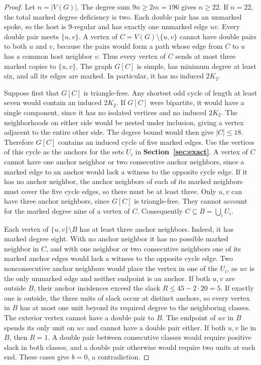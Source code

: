 \begin{proof}
Let $n=|V(G)|$. The degree sum $9n\ge2m=196$ gives $n\ge22$.
If $n=22$, the total marked degree deficiency is two. Each
double pair has an unmarked spoke, so the host is 9-regular
and has exactly one unmarked edge $uv$. Every double pair
meets $\{u,v\}$. A vertex of $C=V(G)\setminus\{u,v\}$ cannot
have double pairs to both $u$ and $v$, because the pairs
would form a path whose edge from $C$ to $u$ has a common
host neighbor $v$. Thus every vertex of $C$ sends at most
three marked copies to $\{u,v\}$. The graph $G[C]$ is
simple, has minimum degree at least six, and all its edges
are marked. In particular, it has no induced $2K_2$.

Suppose first that $G[C]$ is triangle-free. Any shortest odd
cycle of length at least seven would contain an induced
$2K_2$. If $G[C]$ were bipartite, it would have a single
component, since it has no isolated vertices and no induced
$2K_2$. The neighborhoods on either side would be nested
under inclusion, giving a vertex adjacent to the entire
other side. The degree bound would then give $|C|\le18$.
Therefore $G[C]$ contains an induced cycle of five marked
edges. Use the vertices of this cycle as the anchors for
the sets $U_i$ in \textbf{Section~\ref{sec:exact}}.
A vertex of $C$ cannot have one anchor neighbor or two
consecutive anchor neighbors, since a marked edge to an
anchor would lack a witness to the opposite cycle edge.
If it has no anchor neighbor, the anchor neighbors of
each of its marked neighbors must cover the five cycle
edges, so there must be at least three. Only $u,v$ can
have three anchor neighbors, since $G[C]$ is triangle-free.
They cannot account for the marked degree nine of a vertex
of $C$. Consequently $C\subseteq B=\bigcup_i U_i$.

Each vertex of $\{u,v\}\setminus B$ has at least three
anchor neighbors. Indeed, it has marked degree eight.
With no anchor neighbor it has no possible marked neighbor
in $C$, and with one neighbor or two consecutive neighbors
one of its marked anchor edges would lack a witness to the
opposite cycle edge. Two nonconsecutive anchor neighbors would
place the vertex in one of the $U_i$, as $uv$ is the only unmarked
edge and neither endpoint is an anchor. If both $u,v$ are outside
$B$, their anchor incidences exceed the slack $R\le45-2\cdot20=5$. If
exactly one is outside, the three units of slack occur at
distinct anchors, so every vertex in $B$ has at most one
unit beyond its required degree to the neighboring classes.
The exterior vertex cannot have a double pair to $B$.
The endpoint of $uv$ in $B$ spends its only unit on $uv$
and cannot have a double pair either. If both $u,v$ lie in
$B$, then $R=1$. A double pair between consecutive classes
would require positive slack in both classes, and a double
pair otherwise would require two units at each end. These
cases give $b=0$, a contradiction.


\end{proof}
